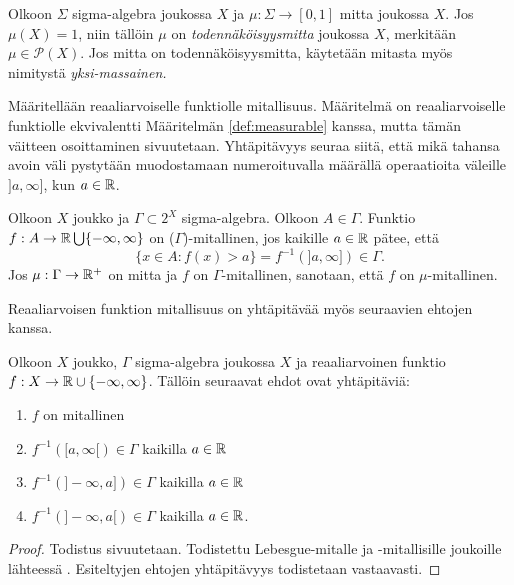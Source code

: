 \documentclass[12pt,oneside,a4paper]{amsbook} %
\begin{document}
\begin{definition}
Olkoon $\Sigma$ sigma-algebra joukossa $X$ ja $\mu:\Sigma \to [0,1]$ mitta joukossa $X$. Jos $\mu(X) = 1$, niin tällöin $\mu$ on \textit{todennäköisyysmitta} joukossa $X$, merkitään $\mu \in \mathcal{P}(X)$. 
    Jos mitta on todennäköisyysmitta, käytetään mitasta myös nimitystä \textit{yksi-massainen.}
\end{definition}

Määritellään reaaliarvoiselle funktiolle mitallisuus. Määritelmä on reaaliarvoiselle funktiolle ekvivalentti Määritelmän \ref{def:measurable} kanssa, mutta tämän väitteen osoittaminen sivuutetaan. Yhtäpitävyys seuraa siitä, että mikä tahansa avoin väli pystytään muodostamaan numeroituvalla määrällä operaatioita väleille $]a, \infty]$, kun $a \in \mathbb{R}$.

\begin{definition}
     Olkoon $X$ joukko ja $\Gamma \subset 2^X$ sigma-algebra. Olkoon $A\in \Gamma$. Funktio $f: A \to \mathbb{R} \bigcup\{-\infty, \infty\}$ on ($\Gamma$)-mitallinen, jos kaikille $a \in \mathbb{R}$ pätee, että
    \begin{equation*}
        \{x \in A : f(x) > a\} = f^{-1}(]a, \infty]) \in \Gamma.
    \end{equation*} 
    Jos $\mu:\Gamma \to {\mathbb{R}^{+}}$ on mitta ja $f$ on $\Gamma$-mitallinen, sanotaan, että $f$ on $\mu$-mitallinen.
\end{definition}

Reaaliarvoisen funktion mitallisuus on yhtäpitävää myös seuraavien ehtojen kanssa.
\begin{lemma}
    Olkoon $X$ joukko, $\Gamma$ sigma-algebra joukossa $X$ ja reaaliarvoinen funktio $f : X \to \mathbb{R} \cup \{-\infty, \infty\}$. Tällöin seuraavat ehdot ovat yhtäpitäviä:
    \begin{enumerate}
        \item $f$ on mitallinen
        \item $f^{-1}([a, \infty[) \in \Gamma $ kaikilla $a \in \mathbb{R}$
        \item $f^{-1}(]-\infty, a])\in \Gamma $ kaikilla $a \in \mathbb{R}$
        \item $f^{-1}(]-\infty, a[)\in \Gamma $ kaikilla $a \in \mathbb{R}$.
    \end{enumerate}
\end{lemma}
\begin{proof}
    Todistus sivuutetaan. Todistettu Lebesgue-mitalle ja -mitallisille joukoille lähteessä \cite[s. 52]{lehrbäck}. Esiteltyjen ehtojen yhtäpitävyys todistetaan vastaavasti.
\end{proof}
\end{document}
